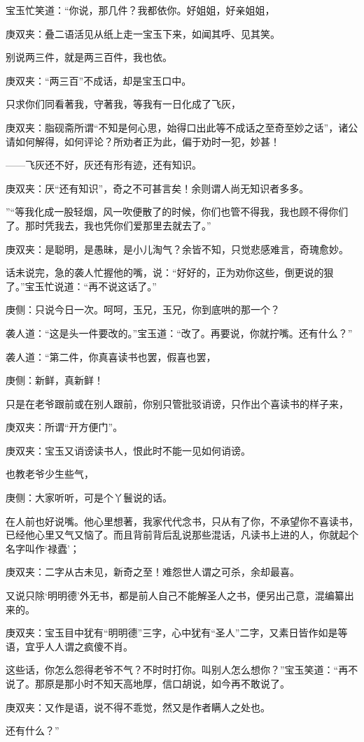 \begin{parag}
    宝玉忙笑道：“你说，那几件？我都依你。好姐姐，好亲姐姐，\begin{note}庚双夹：叠二语活见从纸上走一宝玉下来，如闻其呼、见其笑。\end{note}别说两三件，就是两三百件，我也依。\begin{note}庚双夹：“两三百”不成话，却是宝玉口中。\end{note}只求你们同看著我，守著我，等我有一日化成了飞灰，\begin{note}庚双夹：脂砚斋所谓“不知是何心思，始得口出此等不成话之至奇至妙之话”，诸公请如何解得，如何评论？所劝者正为此，偏于劝时一犯，妙甚！\end{note}——飞灰还不好，灰还有形有迹，还有知识。\begin{note}庚双夹：厌“还有知识”，奇之不可甚言矣！余则谓人尚无知识者多多。\end{note}”“等我化成一股轻烟，风一吹便散了的时候，你们也管不得我，我也顾不得你们了。那时凭我去，我也凭你们爱那里去就去了。”\begin{note}庚双夹：是聪明，是愚昧，是小儿淘气？余皆不知，只觉悲感难言，奇瑰愈妙。\end{note}话未说完，急的袭人忙握他的嘴，说：“好好的，正为劝你这些，倒更说的狠了。”宝玉忙说道：“再不说这话了。”\begin{note}庚侧：只说今日一次。呵呵，玉兄，玉兄，你到底哄的那一个？\end{note}袭人道：“这是头一件要改的。”宝玉道：“改了。再要说，你就拧嘴。还有什么？”
\end{parag}


\begin{parag}
    袭人道：“第二件，你真喜读书也罢，假喜也罢，\begin{note}庚侧：新鲜，真新鲜！\end{note}只是在老爷跟前或在别人跟前，你别只管批驳诮谤，只作出个喜读书的样子来，\begin{note}庚双夹：所谓“开方便门”。\end{note}\begin{note}庚双夹：宝玉又诮谤读书人，恨此时不能一见如何诮谤。\end{note}也教老爷少生些气，\begin{note}庚侧：大家听听，可是个丫鬟说的话。\end{note}在人前也好说嘴。他心里想著，我家代代念书，只从有了你，不承望你不喜读书，已经他心里又气又恼了。而且背前背后乱说那些混话，凡读书上进的人，你就起个名字叫作‘禄蠹’；\begin{note}庚双夹：二字从古未见，新奇之至！难怨世人谓之可杀，余却最喜。\end{note}又说只除‘明明德’外无书，都是前人自己不能解圣人之书，便另出己意，混编纂出来的。\begin{note}庚双夹：宝玉目中犹有“明明德”三字，心中犹有“圣人”二字，又素日皆作如是等语，宜乎人人谓之疯傻不肖。\end{note}这些话，你怎么怨得老爷不气？不时时打你。叫别人怎么想你？”宝玉笑道：“再不说了。那原是那小时不知天高地厚，信口胡说，如今再不敢说了。\begin{note}庚双夹：又作是语，说不得不乖觉，然又是作者瞒人之处也。\end{note}还有什么？”
\end{parag}


